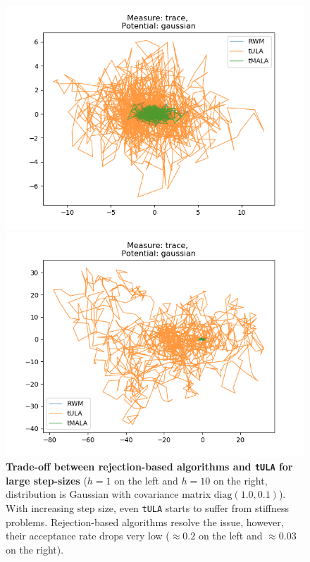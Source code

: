 \begin{figure}[H]
\centering
  \begin{minipage}[b]{0.49\textwidth}
  \centering
    \includegraphics[width=\textwidth]{Figures/tula_tmala_step_1.png}
  \end{minipage} %
  \begin{minipage}[b]{0.49\textwidth}
  \centering
    \includegraphics[width=\textwidth]{Figures/tula_tmala_step_10.png}
  \end{minipage}
   \caption{\textbf{Trade-off between rejection-based algorithms and \texttt{tULA} for large step-sizes} ($h = 1$ on the left and $h = 10$ on the right, distribution is Gaussian with covariance matrix $\text{diag}(1.0, 0.1)$). With increasing step size, even \texttt{tULA} starts to suffer from stiffness problems. Rejection-based algorithms resolve the issue, however, their acceptance rate drops very low ($\approx 0.2$ on the left and $\approx 0.03$ on the right). }
\end{figure}




